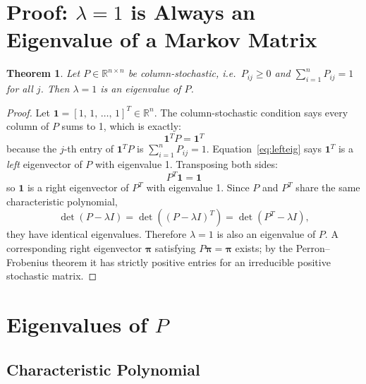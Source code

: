 \documentclass[12pt, a4paper]{article}
\newtheorem{theorem}{Theorem}
\begin{document}
\section{Proof: $\lambda = 1$ is Always an Eigenvalue of a Markov Matrix}

\begin{theorem}
Let $P \in \mathbb{R}^{n \times n}$ be column-stochastic, i.e.\
$P_{ij} \geq 0$ and $\sum_{i=1}^{n} P_{ij} = 1$ for all $j$.
Then $\lambda = 1$ is an eigenvalue of $P$.
\end{theorem}

\begin{proof}
Let $\mathbf{1} = [1,\,1,\,\ldots,\,1]^T \in \mathbb{R}^n$.  The column-stochastic
condition says every column of $P$ sums to 1, which is exactly:
\begin{equation}
  \mathbf{1}^T P = \mathbf{1}^T
  \label{eq:lefteig}
\end{equation}
because the $j$-th entry of $\mathbf{1}^T P$ is $\sum_{i=1}^{n} P_{ij} = 1$.
Equation~\eqref{eq:lefteig} says $\mathbf{1}^T$ is a \emph{left} eigenvector of
$P$ with eigenvalue 1.  Transposing both sides:
\begin{equation}
  P^T \mathbf{1} = \mathbf{1}
\end{equation}
so $\mathbf{1}$ is a right eigenvector of $P^T$ with eigenvalue 1.  Since $P$
and $P^T$ share the same characteristic polynomial,
\begin{equation}
  \det(P - \lambda I) = \det\!\left((P-\lambda I)^T\right) = \det(P^T - \lambda I),
\end{equation}
they have identical eigenvalues.  Therefore $\lambda = 1$ is also an eigenvalue
of $P$.  A corresponding right eigenvector $\boldsymbol{\pi}$ satisfying
$P\boldsymbol{\pi} = \boldsymbol{\pi}$ exists; by the Perron--Frobenius theorem it
has strictly positive entries for an irreducible positive stochastic matrix.
\end{proof}

\section{Eigenvalues of $P$}

\subsection*{Characteristic Polynomial}
\end{document}
